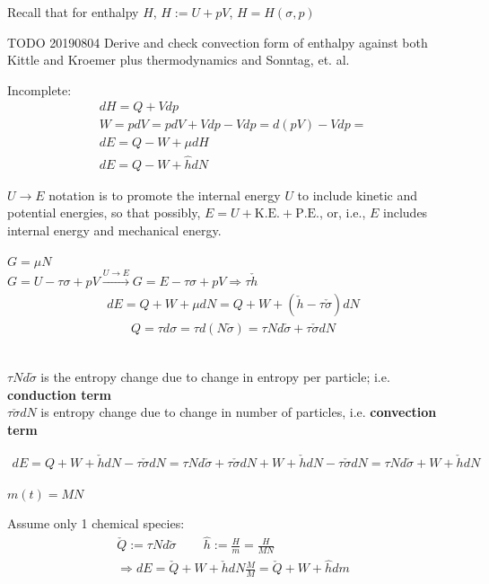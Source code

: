 \documentclass[10pt]{amsart}
\begin{document}
\begin{multicols*}{2}
Recall that for enthalpy $H$, $H := U + pV$, $H=H(\sigma, p)$

TODO 20190804 Derive and check convection form of enthalpy against both Kittle and Kroemer plus thermodynamics and Sonntag, et. al. 

Incomplete:
\[
\begin{gathered} 
dH = Q + Vdp \\
W = pdV = pdV + Vdp - Vdp = d(pV) - Vdp = \\
dE = Q-W + \mu dH \\
dE = Q- W + \widehat{h} dN
\end{gathered} 
\]

$U \to E$ notation is to promote the internal energy $U$ to include kinetic and potential energies, so that possibly, $E = U + \text{K.E.} + \text{P.E.}$, or, i.e., $E$ includes internal energy and mechanical energy.

$G = \mu N$ \\
$G = U - \tau \sigma + pV \xrightarrow{U \to E} G = E-\tau \sigma + pV \Longrightarrow \tau \check{h}$
\[
\begin{gathered}
dE = Q + W + \mu dN = Q + W + (\check{h} - \tau \check{\sigma})dN
\end{gathered}
\]
\[
\begin{gathered}
Q = \tau d\sigma = \tau d(N \check{\sigma}) = \tau N d\check{\sigma} + \tau \check{\sigma} dN
\end{gathered}
\]

\quad \\ 
$\tau N d\check{\sigma}$ is the entropy change due to change in entropy per particle; i.e. \textbf{conduction term} \\
$\tau \check{\sigma} dN$ is entropy change due to change in number of particles, i.e. \textbf{convection term}

\[
\begin{gathered}
dE = Q + W + \check{h} dN - \tau \check{\sigma} dN = \tau N d\check{\sigma} + \tau \check{\sigma} dN + W + \check{h} dN - \tau \check{\sigma} dN = \tau N d\check{\sigma} + W + \check{h} dN
\end{gathered}
\]

$m(t) = MN$

Assume only 1 chemical species:
\[
\begin{gathered}
	\check{Q} := \tau N d\check{\sigma} \qquad \, \widehat{h} := \frac{H}{m} = \frac{H}{MN} \\ 
 \Longrightarrow dE = \check{Q} + W + \check{h} dN \frac{M}{M} = \check{Q} + W + \widehat{h} dm
\end{gathered}
\]


\end{multicols*}
\end{document}
